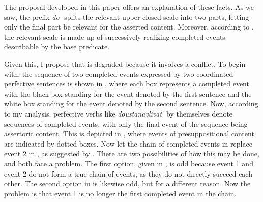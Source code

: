 \documentclass[output=paper,
colorlinks,
citecolor=brown,
newtxmath
]{langscibook}
\begin{document}
{
\z}

\noindent The proposal developed in this paper offers an explanation of these facts. As we saw, the prefix \textit{do-} splits the relevant upper-closed scale into two parts, letting only the final part be relevant for the asserted content. Moreover, according to , the relevant scale is made up of successively realizing completed events describable by the base predicate.

Given this, I propose that  is degraded because it involves a conflict. To begin with, the sequence of two completed events expressed by two coordinated perfective sentences is shown in , where each box represents a completed event with the black box standing for the event denoted by the first sentence and the white box standing for the event denoted by the second sentence.  Now, according to my analysis, perfective verbs like \textit{doustanavlivat'} by themselves denote sequences of completed events, with only the final event of the sequence being assertoric content. This is depicted in , where events of presuppositional content are indicated by dotted boxes. Now let the chain of completed events in  replace event 2 in , as suggested by . There are two possibilities of how this may be done, and both face a problem. The first option, given in , is odd because event 1 and event 2 do not form a true chain of events, as they do not directly succeed each other. The second option in  is likewise odd, but for a different reason. Now the problem is that event 1 is no longer the first completed event in the chain.
\end{document}
